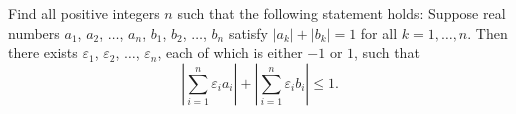 Find all positive integers 
$n$
 such that the following statement holds: Suppose real numbers 
$a_1$, 
$a_2$, 
$\dots$, 
$a_n$, 
$b_1$, 
$b_2$, 
$\dots$, 
$b_n$
 satisfy 
$|a_k|+|b_k|=1$
 for all 
$k=1,\dots,n$. 
 Then there exists 
$\varepsilon_1$, 
$\varepsilon_2$, 
$\dots$, 
$\varepsilon_n$,
each of which is either 
$-1$
 or 
$1$, 
 such that
\[ \left| \sum_{i=1}^n \varepsilon_i a_i \right| + \left| \sum_{i=1}^n \varepsilon_i b_i \right| \le 1. \]